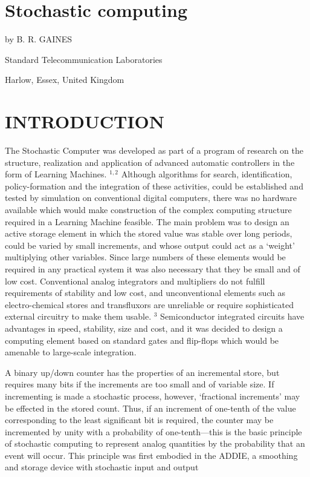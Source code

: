 \documentclass[
  10
]{article}
\author{}
\date{}
\begin{document}
\section{Stochastic computing}\label{stochastic-computing}

by B. R. GAINES

Standard Telecommunication Laboratories

Harlow, Essex, United Kingdom

\section{INTRODUCTION}\label{introduction}

The Stochastic Computer was developed as part of a program of research
on the structure, realization and application of advanced automatic
controllers in the form of Learning Machines. \(^{1,2}\) Although
algorithms for search, identification, policy-formation and the
integration of these activities, could be established and tested by
simulation on conventional digital computers, there was no hardware
available which would make construction of the complex computing
structure required in a Learning Machine feasible. The main problem was
to design an active storage element in which the stored value was stable
over long periods, could be varied by small increments, and whose output
could act as a `weight' multiplying other variables. Since large numbers
of these elements would be required in any practical system it was also
necessary that they be small and of low cost. Conventional analog
integrators and multipliers do not fulfill requirements of stability and
low cost, and unconventional elements such as electro-chemical stores
and transfluxors are unreliable or require sophisticated external
circuitry to make them usable. \(^3\) Semiconductor integrated circuits
have advantages in speed, stability, size and cost, and it was decided
to design a computing element based on standard gates and flip-flops
which would be amenable to large-scale integration.

A binary up/down counter has the properties of an incremental store, but
requires many bits if the increments are too small and of variable size.
If incrementing is made a stochastic process, however, `fractional
increments' may be effected in the stored count. Thus, if an increment
of one-tenth of the value corresponding to the least significant bit is
required, the counter may be incremented by unity with a probability of
one-tenth---this is the basic principle of stochastic computing to
represent analog quantities by the probability that an event will occur.
This principle was first embodied in the ADDIE, a smoothing and storage
device with stochastic input and output
\end{document}
